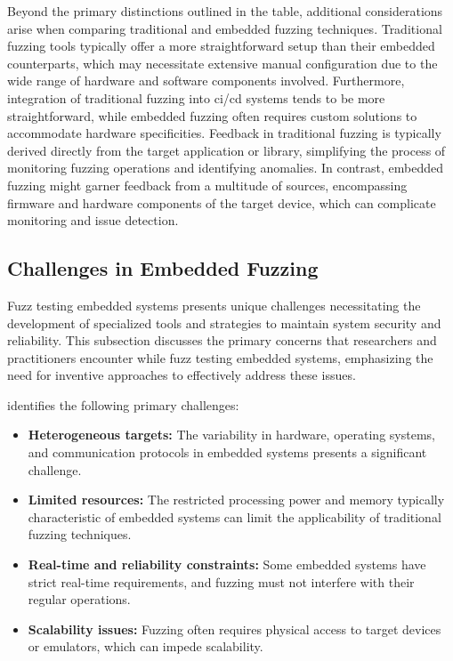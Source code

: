 Beyond the primary distinctions outlined in the table, additional considerations arise when
comparing traditional and embedded fuzzing techniques. Traditional fuzzing tools
typically offer a more straightforward setup than their embedded counterparts,
which may necessitate extensive manual configuration due to the wide range of
hardware and software components involved. Furthermore, integration of traditional
fuzzing into \acrlong{ci/cd} systems tends to be more straightforward,
while embedded fuzzing often requires custom solutions to accommodate
hardware specificities. Feedback in traditional fuzzing is typically
derived directly from the target application or library,
simplifying the process of monitoring fuzzing operations and
identifying anomalies. In contrast, embedded fuzzing might garner feedback
from a multitude of sources, encompassing firmware and hardware components
of the target device, which can complicate monitoring and issue detection\cite{yun2022fuzzing}\cite{WhatAreE30:online}.

\subsection{Challenges in Embedded Fuzzing}
Fuzz testing embedded systems presents unique challenges necessitating the development of specialized tools and strategies to maintain system security and reliability. This subsection discusses the primary concerns that researchers and practitioners encounter while fuzz testing embedded systems, emphasizing the need for inventive approaches to effectively address these issues.

 identifies the following primary challenges:
\begin{itemize}
\item \textbf{Heterogeneous targets:} The variability in hardware, operating systems, and communication protocols in embedded systems presents a significant challenge\cite{yun2022fuzzing}.
\item \textbf{Limited resources:} The restricted processing power and memory typically characteristic of embedded systems can limit the applicability of traditional fuzzing techniques\cite{yun2022fuzzing}.
\item \textbf{Real-time and reliability constraints:} Some embedded systems have strict real-time requirements, and fuzzing must not interfere with their regular operations\cite{yun2022fuzzing}.
\item \textbf{Scalability issues:} Fuzzing often requires physical access to target devices or emulators, which can impede scalability\cite{yun2022fuzzing}.
\end{itemize}

